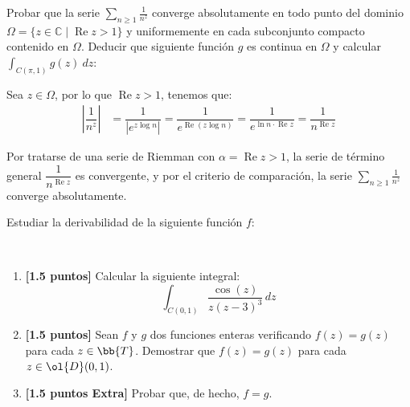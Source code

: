 \documentclass[12pt]{article}
\renewcommand{\Re}{\operatorname{Re}} %
\begin{document}
    \newpage
    \setcounter{ejercicio}{0}

    \begin{ejercicio}[4 puntos]
        Probar que la serie $\displaystyle \sum_{n\geq 1} \frac{1}{n^z}$ converge absolutamente en todo punto del dominio $\Omega = \{ z \in \mathbb{C} \mid \Re z > 1 \}$ y uniformemente en cada subconjunto compacto contenido en $\Omega$. Deducir que siguiente función $g$ es continua en $\Omega$ y calcular $\displaystyle \int_{C(\pi,1)} g(z) \ dz$:

        Sea $z\in \Omega$, por lo que $\Re z > 1$, tenemos que:
        \begin{align*}
            \left|\dfrac{1}{n^z}\right| &= \dfrac{1}{|e^{z \log n}|} = \dfrac{1}{e^{\Re(z\log n)}} = \dfrac{1}{e^{\ln n\cdot \Re z}} = \dfrac{1}{n^{\Re z}}
        \end{align*}

        Por tratarse de una serie de Riemman con $\alpha = \Re z > 1$, la serie de término general $\dfrac{1}{n^{\Re z}}$ es convergente, y por el criterio de comparación, la serie $\displaystyle \sum_{n\geq 1} \frac{1}{n^z}$ converge absolutamente.
    \end{ejercicio}

    \begin{ejercicio}[3 puntos]
        Estudiar la derivabilidad de la siguiente función $f$:
    \end{ejercicio}

    \begin{ejercicio}[3 puntos]~
        \begin{enumerate}
            \item \textbf{[1.5 puntos]} Calcular la siguiente integral:
            \begin{equation*}
                \int_{C(0,1)} \frac{\cos(z)}{z(z-3)^3} \, dz
            \end{equation*}
            \item \textbf{[1.5 puntos]} Sean $f$ y $g$ dos funciones enteras verificando $f(z) = g(z)$ para cada $z \in \bb{T}$. Demostrar que $f(z) = g(z)$ para cada $z \in \ol{D}(0, 1)$. 
            \item \textbf{[1.5 puntos Extra]} Probar que, de hecho, $f = g$.
        \end{enumerate}
    \end{ejercicio}
\end{document}
